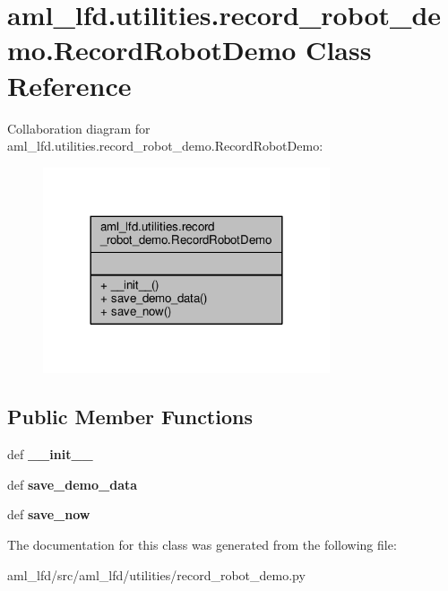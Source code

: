 \hypertarget{classaml__lfd_1_1utilities_1_1record__robot__demo_1_1_record_robot_demo}{\section{aml\-\_\-lfd.\-utilities.\-record\-\_\-robot\-\_\-demo.\-Record\-Robot\-Demo Class Reference}
\label{classaml__lfd_1_1utilities_1_1record__robot__demo_1_1_record_robot_demo}
}


Collaboration diagram for aml\-\_\-lfd.\-utilities.\-record\-\_\-robot\-\_\-demo.\-Record\-Robot\-Demo\-:\nopagebreak
\begin{figure}[H]
\begin{center}
\leavevmode
\includegraphics[width=240pt]{classaml__lfd_1_1utilities_1_1record__robot__demo_1_1_record_robot_demo__coll__graph}
\end{center}
\end{figure}
\subsection*{Public Member Functions}
\begin{DoxyCompactItemize}
\item 
\hypertarget{classaml__lfd_1_1utilities_1_1record__robot__demo_1_1_record_robot_demo_ad637b041693aa54c5dde45bcc4bddb9d}{def {\bfseries \-\_\-\-\_\-init\-\_\-\-\_\-}}\label{classaml__lfd_1_1utilities_1_1record__robot__demo_1_1_record_robot_demo_ad637b041693aa54c5dde45bcc4bddb9d}

\item 
\hypertarget{classaml__lfd_1_1utilities_1_1record__robot__demo_1_1_record_robot_demo_a9a09c8991dd3c0b09f6d4b682085d9ab}{def {\bfseries save\-\_\-demo\-\_\-data}}\label{classaml__lfd_1_1utilities_1_1record__robot__demo_1_1_record_robot_demo_a9a09c8991dd3c0b09f6d4b682085d9ab}

\item 
\hypertarget{classaml__lfd_1_1utilities_1_1record__robot__demo_1_1_record_robot_demo_ab2a31579a4749e8c23441a344c6233cd}{def {\bfseries save\-\_\-now}}\label{classaml__lfd_1_1utilities_1_1record__robot__demo_1_1_record_robot_demo_ab2a31579a4749e8c23441a344c6233cd}

\end{DoxyCompactItemize}


The documentation for this class was generated from the following file\-:\begin{DoxyCompactItemize}
\item 
aml\-\_\-lfd/src/aml\-\_\-lfd/utilities/record\-\_\-robot\-\_\-demo.\-py\end{DoxyCompactItemize}
